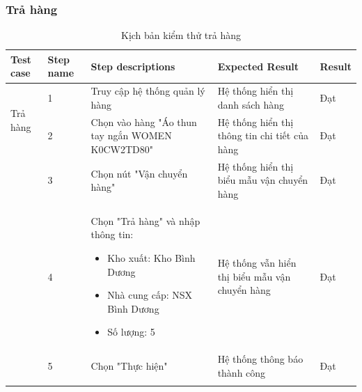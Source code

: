 \subsubsection{Trả hàng}
{
    \setlength\extrarowheight{6pt}
    \begin{longtable}{| p{2.5cm}| p{1cm}| p{5.5cm}| p{4.5cm} | p{1.5cm} |}
        \hline
        \textbf{Test case}               & \textbf{Step name}                             & \textbf{Step descriptions}                       & \textbf{Expected Result}                      & \textbf{Result} \\
        \hline
        \multirow[t]{2}{2.5cm}{Trả hàng} & 1                                              & Truy cập hệ thống quản lý hàng                   & Hệ thống hiển thị danh sách hàng              & Đạt             \\
        \cline{2-5}
                                         & 2                                              & Chọn vào hàng "Áo thun tay ngắn WOMEN K0CW2TD80" & Hệ thống hiển thị thông tin chi tiết của hàng & Đạt             \\
        \cline{2-5}
                                         & 3                                              & Chọn nút "Vận chuyển hàng"                       & Hệ thống hiển thị biểu mẫu vận chuyển hàng    & Đạt             \\
        \cline{2-5}
                                         & 4                                              & Chọn "Trả hàng" và nhập thông tin:
        \begin{itemize}
            \item Kho xuất: Kho Bình Dương
            \item Nhà cung cấp: NSX Bình Dương
            \item Số lượng: 5
        \end{itemize}
                                         & Hệ thống vẫn hiển thị biểu mẫu vận chuyển hàng & Đạt                                                                                                                \\
        \cline{2-5}
                                         & 5                                              & Chọn "Thực hiện"                                 & Hệ thống thông báo thành công                 & Đạt             \\
        \hline
        \caption{Kịch bản kiểm thử trả hàng}
    \end{longtable}
}


